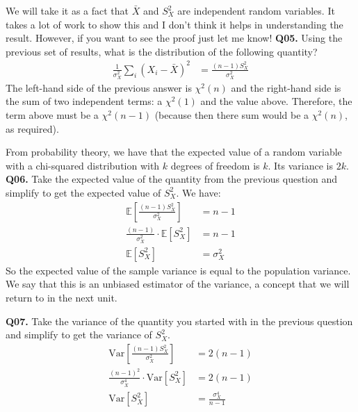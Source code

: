 \documentclass[12pt]{article}
\newcommand{\E}{\mathbb{E}}
\newcommand{\V}{\text{Var}}
\newcommand{\cblack}{\color{Black}}
\newcommand{\cblue}{\color{MidnightBlue}}
\begin{document}
We will take it as a fact that $\bar{X}$ and $S_X^2$ are independent random
variables. It takes a lot of work to show this and I don't think it helps in
understanding the result. However, if you want to see the proof just let me know!
\textbf{Q05.} Using the previous set of results, what is the distribution of
the following quantity?
\begin{align*}
\frac{1}{\sigma_X^2} \sum_i (X_i - \bar{X})^2 &= \frac{(n-1) S_X^2}{\sigma_X^2}
\end{align*}
\cblue The left-hand side of the previous answer is $\chi^2(n)$ and the right-hand
side is the sum of two independent terms: a $\chi^2(1)$ and the value above. Therefore,
the term above must be a $\chi^2(n-1)$ (because then there sum would be a $\chi^2(n)$,
as required). \cblack

From probability theory, we have that the expected value of a random variable with
a chi-squared distribution with $k$ degrees of freedom is $k$. Its variance is $2k$.
\textbf{Q06.} Take the expected value of the quantity from the previous question and
simplify to get the expected value of $S_X^2$. \cblue We have:
\begin{align*}
\E \left[ \frac{(n-1) S_X^2}{\sigma_X^2} \right] &= n-1 \\
\frac{(n-1)}{\sigma_X^2} \cdot \E \left[ S_X^2 \right] &= n-1 \\
\E \left[ S_X^2 \right] &= \sigma_X^2
\end{align*}
So the expected value of the sample variance is equal to the population variance.
We say that this is an unbiased estimator of the variance, a concept that we will
return to in the next unit. \cblack

\textbf{Q07.} Take the
variance of the quantity you started with in the previous question and simplify
to get the variance of $S_X^2$. \cblue
\begin{align*}
\V \left[ \frac{(n-1) S_X^2}{\sigma_X^2} \right] &= 2(n-1) \\
\frac{(n-1)^2}{\sigma_X^4} \cdot \V \left[ S_X^2 \right] &= 2(n-1) \\
\V \left[ S_X^2 \right] &= \frac{\sigma_X^4}{n-1}
\end{align*}
\cblack 
\end{document}
